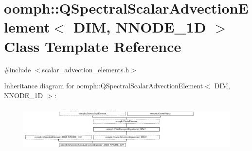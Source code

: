 \hypertarget{classoomph_1_1QSpectralScalarAdvectionElement}{}\section{oomph\+:\+:Q\+Spectral\+Scalar\+Advection\+Element$<$ D\+IM, N\+N\+O\+D\+E\+\_\+1D $>$ Class Template Reference}
\label{classoomph_1_1QSpectralScalarAdvectionElement}


{\ttfamily \#include $<$scalar\+\_\+advection\+\_\+elements.\+h$>$}

Inheritance diagram for oomph\+:\+:Q\+Spectral\+Scalar\+Advection\+Element$<$ D\+IM, N\+N\+O\+D\+E\+\_\+1D $>$\+:\begin{figure}[H]
\begin{center}
\leavevmode
\includegraphics[height=2.443281cm]{classoomph_1_1QSpectralScalarAdvectionElement}
\end{center}
\end{figure}
